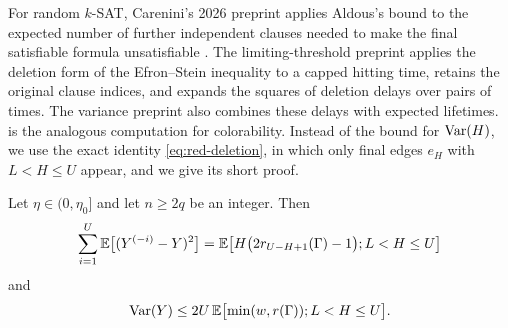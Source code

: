 For random $k$-SAT, Carenini's 2026 preprint applies Aldous's bound to the expected number of further independent clauses needed to make the final satisfiable formula unsatisfiable \cite[Theorem~4.1 and equation~(4.1)]{carenini2026polynomial}. The limiting-threshold preprint \cite[Lemmas~3.1 and~3.2]{openai2026limiting} applies the deletion form of the Efron--Stein inequality to a capped hitting time, retains the original clause indices, and expands the squares of deletion delays over pairs of times. The variance preprint \cite[Section~3.3, Lemma~3.4]{openai2026variance} also combines these delays with expected lifetimes.  is the analogous computation for colorability. Instead of the bound for $\operatorname{Var}(H)$, we use the exact identity \eqref{eq:red-deletion}, in which only final edges $e_H$ with $L < H \le U$ appear, and we give its short proof.

\begin{lemma}\label{lem:red-deletion}
Let $\eta \in (0, \eta_0]$ and let $n \ge 2q$ be an integer. Then
\begin{equation}\label{eq:red-deletion}
\sum_{i = 1}^{U} \mathbb E\bigl[(Y^{(-i)} - Y)^2\bigr] = \mathbb E\bigl[H \bigl(2 r_{U - H + 1}(\Gamma) - 1\bigr); L < H \le U\bigr]
\end{equation}
and
\begin{equation}\label{eq:red-var-upper}
\operatorname{Var}(Y) \le 2U \, \mathbb E\bigl[\min(w, r(\Gamma)); L < H \le U\bigr].
\end{equation}
\end{lemma}

